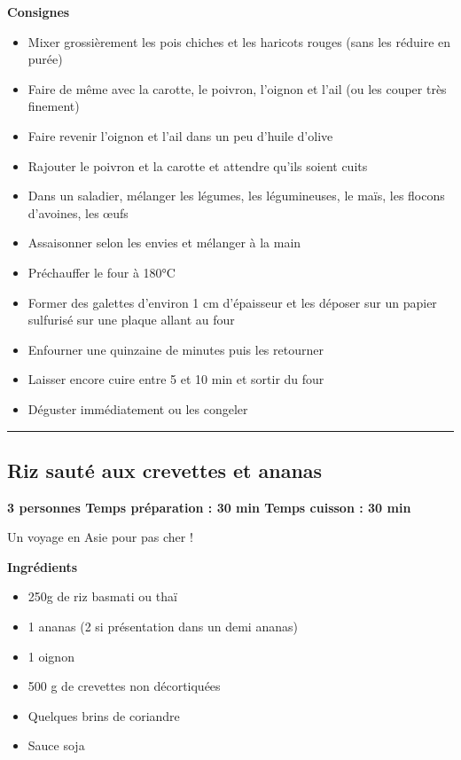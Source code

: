 \documentclass[]{book}
\providecommand{\tightlist}{%
  \setlength{\itemsep}{0pt}\setlength{\parskip}{0pt}}
\begin{document}
\textbf{Consignes}

\begin{itemize}
\tightlist
\item
  Mixer grossièrement les pois chiches et les haricots rouges (sans les
  réduire en purée)
\item
  Faire de même avec la carotte, le poivron, l'oignon et l'ail (ou les
  couper très finement)
\item
  Faire revenir l'oignon et l'ail dans un peu d'huile d'olive
\item
  Rajouter le poivron et la carotte et attendre qu'ils soient cuits
\item
  Dans un saladier, mélanger les légumes, les légumineuses, le maïs, les
  flocons d'avoines, les œufs
\item
  Assaisonner selon les envies et mélanger à la main
\item
  Préchauffer le four à 180°C
\item
  Former des galettes d'environ 1 cm d'épaisseur et les déposer sur un
  papier sulfurisé sur une plaque allant au four
\item
  Enfourner une quinzaine de minutes puis les retourner
\item
  Laisser encore cuire entre 5 et 10 min et sortir du four
\item
  Déguster immédiatement ou les congeler
\end{itemize}

\begin{center}\rule{0.5\linewidth}{0.5pt}\end{center}

\subsection*{\texorpdfstring{{Riz sauté aux crevettes et
ananas}}{Riz sauté aux crevettes et ananas}}\label{riz-sautuxe9-aux-crevettes-et-ananas}

\begin{salebox}
\textbf{3 personnes \textbar{} Temps préparation : 30 min \textbar{}
Temps cuisson : 30 min}

Un voyage en Asie pour pas cher !
\end{salebox}

 \textbf{Ingrédients}

\begin{itemize}
\tightlist
\item
  250g de riz basmati ou thaï
\item
  1 ananas (2 si présentation dans un demi ananas)
\item
  1 oignon
\item
  500 g de crevettes non décortiquées
\item
  Quelques brins de coriandre
\item
  Sauce soja
\end{itemize}
\end{document}
